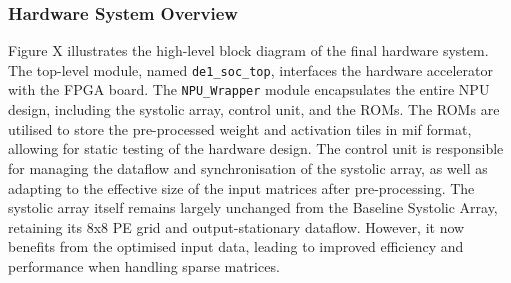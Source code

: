 \documentclass[12pt, a4paper, ukenglish]{article}
\begin{document}
    \subsubsection{Hardware System Overview} \label{sec: optimised hw}
    Figure X illustrates the high-level block diagram of the final hardware system. The top-level module, named \texttt{de1\_soc\_top}, interfaces the hardware accelerator with the FPGA board. The \texttt{NPU\_Wrapper} module encapsulates the entire NPU design, including the systolic array, control unit, and the ROMs. The ROMs are utilised to store the pre-processed weight and activation tiles in mif format, allowing for static testing of the hardware design. The control unit is responsible for managing the dataflow and synchronisation of the systolic array, as well as adapting to the effective size of the input matrices after pre-processing. The systolic array itself remains largely unchanged from the Baseline Systolic Array, retaining its 8x8 PE grid and output-stationary dataflow. However, it now benefits from the optimised input data, leading to improved efficiency and performance when handling sparse matrices.

            
\end{document}

